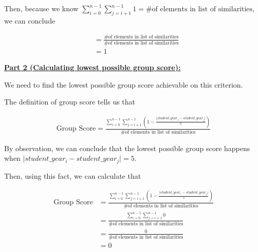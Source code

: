 \documentclass[12pt]{article}
\begin{document}
\begin{itemize}
    \bigskip

    Then, because we know $\sum\limits_{i=0}^{n-1}\sum\limits_{j=i+1}^{n-1} 1 = \text{\# of elements in list of similarities}$,
    we can conclude

    \begin{align}
        &= \frac{\text{\# of elements in list of similarities}}{\text{\# of elements in list of similarities}}\\
        &= 1
    \end{align}

    \bigskip

    \underline{\textbf{Part 2 (Calculating lowest possible group score):}}

    \bigskip

    We need to find the lowest possible group score achievable on this criterion.

    \bigskip

    The definition of group score tells us that

    \begin{align}
        \text{Group Score} = \frac{\displaystyle\sum\limits_{i=0}^{n-1} \displaystyle\sum\limits_{j=i+1}^{n-1} \left(1 - \displaystyle\frac{\lvert student\_year_i - student\_year_j \rvert}{5} \right)}{\text{\# of elements in list of similarities}}
    \end{align}

    \bigskip

    By observation, we can conclude that the lowest possible group score happens when
    $\lvert student\_year_i - student\_year_j \rvert = 5$.

    \bigskip

    Then, using this fact, we can calculate that

    \begin{align}
        \text{Group Score} &= \frac{\displaystyle\sum\limits_{i=0}^{n-1} \displaystyle\sum\limits_{j=i+1}^{n-1} \left(1 - \displaystyle\frac{\lvert student\_year_i - student\_year_j \rvert}{5} \right)}{\text{\# of elements in list of similarities}}\\
        &= \frac{\displaystyle\sum\limits_{i=0}^{n-1} \displaystyle\sum\limits_{j=i+1}^{n-1} 0}{\text{\# of elements in list of similarities}}\\
        &= \frac{0}{\text{\# of elements in list of similarities}}\\
        &= 0
    \end{align}
\end{itemize}
\end{document}
